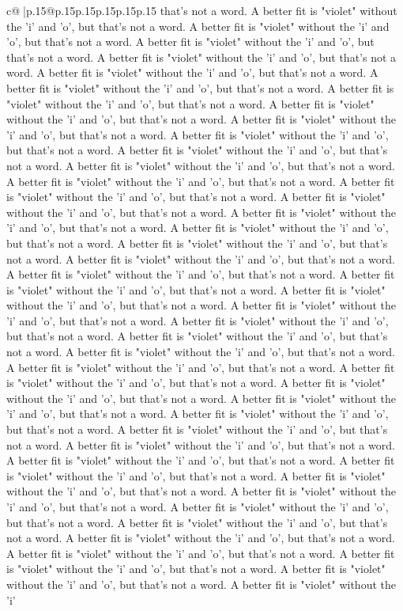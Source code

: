 \documentclass{article}
\begin{document}
{\begin{supertabular}{c@{$\;$}|p{.15\linewidth}@{}p{.15\linewidth}p{.15\linewidth}p{.15\linewidth}p{.15\linewidth}p{.15\linewidth}}
{{{that's not a word. A better fit is "violet" without the 'i' and 'o', but that's not a word. A better fit is "violet" without the 'i' and 'o', but that's not a word. A better fit is "violet" without the 'i' and 'o', but that's not a word. A better fit is "violet" without the 'i' and 'o', but that's not a word. A better fit is "violet" without the 'i' and 'o', but that's not a word. A better fit is "violet" without the 'i' and 'o', but that's not a word. A better fit is "violet" without the 'i' and 'o', but that's not a word. A better fit is "violet" without the 'i' and 'o', but that's not a word. A better fit is "violet" without the 'i' and 'o', but that's not a word. A better fit is "violet" without the 'i' and 'o', but that's not a word. A better fit is "violet" without the 'i' and 'o', but that's not a word. A better fit is "violet" without the 'i' and 'o', but that's not a word. A better fit is "violet" without the 'i' and 'o', but that's not a word. A better fit is "violet" without the 'i' and 'o', but that's not a word. A better fit is "violet" without the 'i' and 'o', but that's not a word. A better fit is "violet" without the 'i' and 'o', but that's not a word. A better fit is "violet" without the 'i' and 'o', but that's not a word. A better fit is "violet" without the 'i' and 'o', but that's not a word. A better fit is "violet" without the 'i' and 'o', but that's not a word. A better fit is "violet" without the 'i' and 'o', but that's not a word. A better fit is "violet" without the 'i' and 'o', but that's not a word. A better fit is "violet" without the 'i' and 'o', but that's not a word. A better fit is "violet" without the 'i' and 'o', but that's not a word. A better fit is "violet" without the 'i' and 'o', but that's not a word. A better fit is "violet" without the 'i' and 'o', but that's not a word. A better fit is "violet" without the 'i' and 'o', but that's not a word. A better fit is "violet" without the 'i' and 'o', but that's not a word. A better fit is "violet" without the 'i' and 'o', but that's not a word. A better fit is "violet" without the 'i' and 'o', but that's not a word. A better fit is "violet" without the 'i' and 'o', but that's not a word. A better fit is "violet" without the 'i' and 'o', but that's not a word. A better fit is "violet" without the 'i' and 'o', but that's not a word. A better fit is "violet" without the 'i' and 'o', but that's not a word. A better fit is "violet" without the 'i' and 'o', but that's not a word. A better fit is "violet" without the 'i' and 'o', but that's not a word. A better fit is "violet" without the 'i' and 'o', but that's not a word. A better fit is "violet" without the 'i' and 'o', but that's not a word. A better fit is "violet" without the 'i' and 'o', but that's not a word. A better fit is "violet" without the 'i' and 'o', but that's not a word. A better fit is "violet" without the 'i' and 'o', but that's not a word. A better fit is "violet" without the 'i' and 'o', but that's not a word. A better fit is "violet" without the 'i' and 'o', but that's not a word. A better fit is "violet" without the 'i' and 'o', but that's not a word. A better fit is "violet" without the 'i' }}}
\end{supertabular}}
\end{document}
